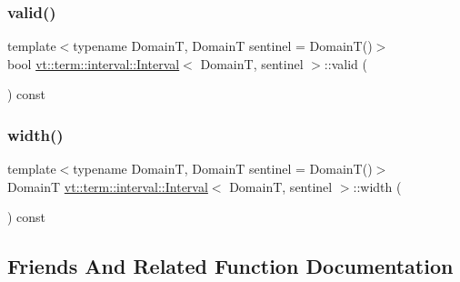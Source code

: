 \subsubsection{\texorpdfstring{valid()}{valid()}}
{\footnotesize\ttfamily template$<$typename DomainT, DomainT sentinel = Domain\+T()$>$ \\
bool \hyperlink{structvt_1_1term_1_1interval_1_1_interval}{vt\+::term\+::interval\+::\+Interval}$<$ DomainT, sentinel $>$\+::valid (\begin{DoxyParamCaption}{ }\end{DoxyParamCaption}) const\hspace{0.3cm}{\ttfamily [inline]}}

\mbox{\label{structvt_1_1term_1_1interval_1_1_interval_af3222f61f45e1e5a7fdd5a127e300289}} 
\subsubsection{\texorpdfstring{width()}{width()}}
{\footnotesize\ttfamily template$<$typename DomainT, DomainT sentinel = Domain\+T()$>$ \\
DomainT \hyperlink{structvt_1_1term_1_1interval_1_1_interval}{vt\+::term\+::interval\+::\+Interval}$<$ DomainT, sentinel $>$\+::width (\begin{DoxyParamCaption}{ }\end{DoxyParamCaption}) const\hspace{0.3cm}{\ttfamily [inline]}}



\subsection{Friends And Related Function Documentation}
\mbox{\label{structvt_1_1term_1_1interval_1_1_interval_ac749dc791f49126328a9a8c69e282e5f}} 
